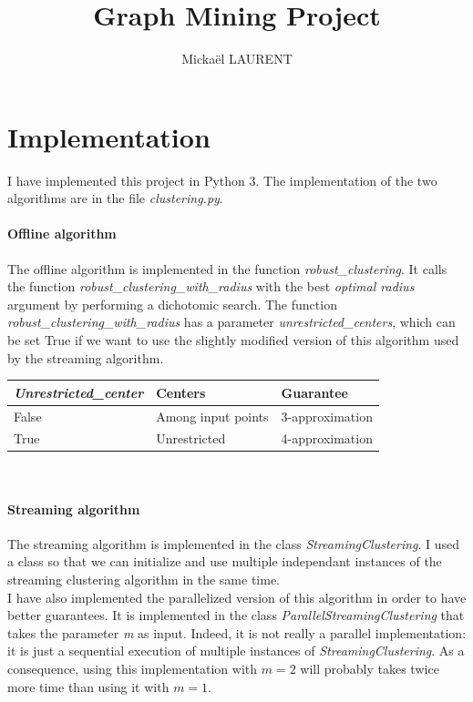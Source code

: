 \documentclass[a4paper]{article}%
\title{\vspace{1.5cm}Graph Mining Project}
\author{Mickaël LAURENT}
\date{\vspace{-5ex}}
\begin{document}
	\maketitle

	\section{Implementation}

	I have implemented this project in Python 3.
	The implementation of the two algorithms are in the file \textit{clustering.py}.

	\paragraph{Offline algorithm} The offline algorithm is implemented in the function \textit{robust\_clustering}.
	It calls the function \textit{robust\_clustering\_with\_radius} with the best \textit{optimal radius} argument by performing a dichotomic search.
	The function \textit{robust\_clustering\_with\_radius} has a parameter \textit{unrestricted\_centers}, which can be set True if we want to use
	the slightly modified version of this algorithm used by the streaming algorithm.\\

	\begin{tabular}{|l|l|l|}
		\hline
		\textit{Unrestricted\_center} & Centers & Guarantee \\
		\hline
		False & Among input points & 3-approximation \\
		True & Unrestricted & 4-approximation \\
		\hline
	 \end{tabular}\\

	\paragraph{Streaming algorithm} The streaming algorithm is implemented in the class \textit{StreamingClustering}.
	I used a class so that we can initialize and use multiple independant instances
	of the streaming clustering algorithm in the same time.\\

	I have also implemented the parallelized version of this algorithm in order to have better guarantees.
	It is implemented in the class \textit{ParallelStreamingClustering} that takes the parameter \textit{m} as input.
	Indeed, it is not really a parallel implementation: it is just a sequential execution of multiple instances
	of \textit{StreamingClustering}. As a consequence, using this implementation with $m=2$ will probably
	takes twice more time than using it with $m=1$.
\end{document}
